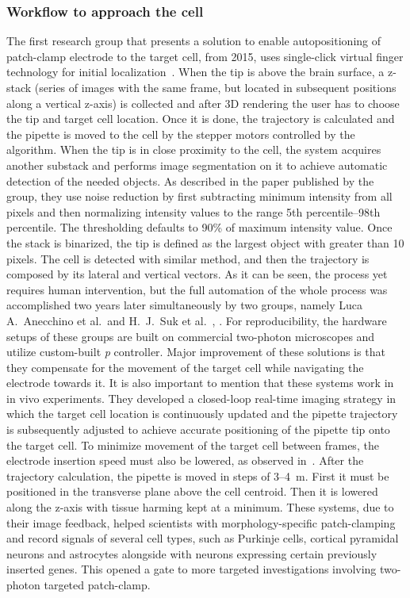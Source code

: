 \documentclass[12pt,a4paper]{report}
\begin{document}
\subsubsection{Workflow to approach the cell}
The first research group that presents a solution to enable autopositioning of patch-clamp electrode to the target cell, from 2015, uses single-click virtual finger technology for initial localization~\cite{long2015}. When the tip is above the brain surface, a z-stack (series of images with the same frame, but located in subsequent positions along a vertical z-axis) is collected and after 3D rendering the user has to choose the tip and target cell location. Once it is done, the trajectory is calculated and the pipette is moved to the cell by the stepper motors controlled by the algorithm. When the tip is in close proximity to the cell, the system acquires another substack and performs image segmentation on it to achieve automatic detection of the needed objects. As described in the paper published by the group, they use noise reduction by first subtracting minimum intensity from all pixels and then normalizing intensity values to the range 5th percentile--98th percentile. The thresholding defaults to 90\% of maximum intensity value. Once the stack is binarized, the tip is defined as the largest object with greater than 10 pixels. The cell is detected with similar method, and then the trajectory is composed by its lateral and vertical vectors.
As it can be seen, the process yet requires human intervention, but the full automation of the whole process was accomplished two years later simultaneously by two groups, namely Luca A.\ Anecchino et al.\ and H.\ J.\ Suk et al.~\cite{annecchino2017}, \cite{suk2017}. For reproducibility, the hardware setups of these groups are built on commercial two-photon microscopes and utilize custom-built \textit{p} controller. Major improvement of these solutions is that they compensate for the movement of the target cell while navigating the electrode towards it. It is also important to mention that these systems work in in vivo experiments. They developed a closed-loop real-time imaging strategy in which the target cell location is continuously updated and the pipette trajectory is subsequently adjusted to achieve accurate positioning of the pipette tip onto the target cell. To minimize movement of the target cell between frames, the electrode insertion speed must also be lowered, as observed in~\cite{annecchino2017}. After the trajectory calculation, the pipette is moved in steps of 3--4~\textmu m. First it must be positioned in the transverse plane above the cell centroid. Then it is lowered along the z-axis with tissue harming kept at a minimum. These systems, due to their image feedback, helped scientists with morphology-specific patch-clamping and record signals of several cell types, such as Purkinje cells, cortical pyramidal neurons and astrocytes alongside with neurons expressing certain previously inserted genes. This opened a gate to more targeted investigations involving two-photon targeted patch-clamp.
\end{document}
